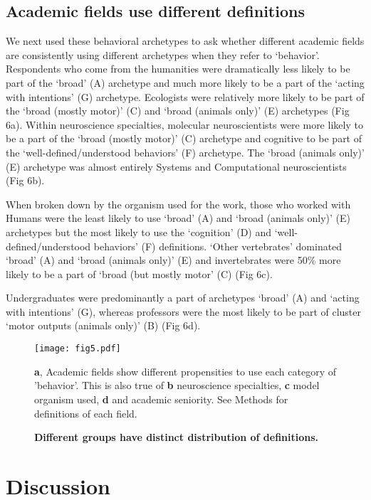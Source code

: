 \documentclass[a4paper, 11pt]{article}
\begin{document}
\subsection*{Academic fields use different definitions}
We next used these behavioral archetypes to ask whether different academic fields are consistently using different archetypes when they refer to `behavior'. Respondents who come from the humanities were dramatically less likely to be part of the `broad' (A) archetype and much more likely to be a part of the `acting with intentions' (G) archetype. Ecologists were relatively more likely to be part of the `broad (mostly motor)' (C) and `broad (animals only)' (E) archetypes (Fig 6a). Within neuroscience specialties, molecular neuroscientists were more likely to be a part of the `broad (mostly motor)' (C) archetype and cognitive to be part of the `well-defined/understood behaviors' (F) archetype. The `broad (animals only)' (E) archetype was almost entirely Systems and Computational neuroscientists (Fig 6b).

When broken down by the organism used for the work, those who worked with Humans were the least likely to use `broad' (A) and `broad (animals only)' (E) archetypes but the most likely to use the `cognition' (D) and `well-defined/understood behaviors' (F) definitions. `Other vertebrates' dominated `broad' (A) and `broad (animals only)' (E) and invertebrates were 50\% more likely to be a part of `broad (but mostly motor' (C) (Fig 6c).

Undergraduates were predominantly a part of archetypes `broad' (A) and `acting with intentions' (G), whereas professors were the most likely to be part of cluster `motor outputs (animals only)' (B) (Fig 6d).

\begin{figure}
\centerline{\texttt{[image: fig5.pdf]}}
\caption{\textbf{Different groups have distinct distribution of definitions.}} \textbf{a}, Academic fields show different propensities to use each category of 'behavior'. This is also true of \textbf{b} neuroscience specialties, \textbf{c} model organism used, \textbf{d} and academic seniority. See Methods for definitions of each field.
\end{figure}

\section*{Discussion}
\end{document}
